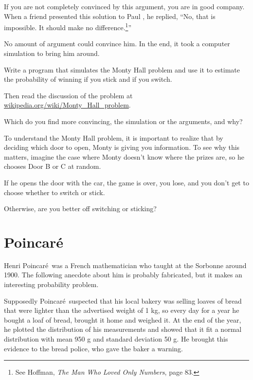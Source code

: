 \documentclass[12pt]{book}
\begin{document}

If you are not completely convinced by this argument, you are
in good company.  When a friend presented this solution to
Paul \Erdos, he replied, ``No, that is impossible.  It should
make no difference.\footnote{See Hoffman, {\em The Man Who Loved
Only Numbers}, page 83.}''

No amount of argument could convince him.  In the end, it took
a computer simulation to bring him around.

\begin{exercise}
Write a program that simulates the Monty Hall problem and use
it to estimate the probability of winning if you stick and if
you switch.

Then read the discussion of the problem at
\url{wikipedia.org/wiki/Monty_Hall_problem}.

Which do you find more convincing, the simulation or the arguments,
and why?

\end{exercise}


\begin{exercise}
To understand the Monty Hall problem, it is important to realize
that by deciding which door to open, Monty is giving you information.
To see why this matters, imagine the case where Monty doesn't
know where the prizes are, so he chooses Door B or C at random.


If he opens the door with the car, the game is over, you lose, and
you don't get to choose whether to switch or stick.

Otherwise, are you better off switching or sticking?

\end{exercise}



\newcommand{\Poincare}{Poincar\'{e}}

\section{\Poincare}

Henri \Poincare~was a French mathematician who taught at the Sorbonne
around 1900.  The following anecdote about him is probably fabricated,
but it makes an interesting probability problem.


Supposedly \Poincare~suspected that his local bakery was selling
loaves of bread that were lighter than the advertised weight of 1 kg,
so every day for a year he bought a loaf of bread, brought it home and
weighed it.  At the end of the year, he plotted the distribution of
his measurements and showed that it fit a normal distribution with
mean 950 g and standard deviation 50 g.  He brought this evidence to
the bread police, who gave the baker a warning.
\end{document}
